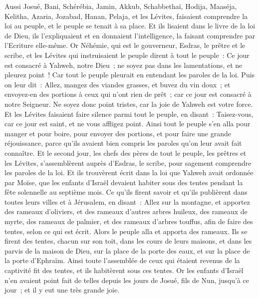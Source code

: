 \begin{multicols}{2}
Aussi Josué, Bani, Schérébia, Jamin, Akkub, Schabbethaï, Hodija, Maaséja, Kelitha, Azaria, Jozabad, Hanan, Pelaja, et les Lévites, faisaient comprendre la loi au peuple, et le peuple se tenait à sa place.
Et ils lisaient dans le livre de la loi de Dieu, ils l'expliquaient et en donnaient l'intelligence, la faisant comprendre par l'Ecriture elle-même.
Or Néhémie, qui est le gouverneur, Esdras, le prêtre et le scribe, et les Lévites qui instruisaient le peuple dirent à tout le peuple~: Ce jour est consacré à Yahweh, notre Dieu~; ne soyez pas dans les lamentations, et ne pleurez point~! Car tout le peuple pleurait en entendant les paroles de la loi.
Puis on leur dit~: Allez, mangez des viandes grasses, et buvez du vin doux~; et envoyez-en des portions à ceux qui n'ont rien de prêt~; car ce jour est consacré à notre Seigneur. Ne soyez donc point tristes, car la joie de Yahweh est votre force.
Et les Lévites faisaient faire silence parmi tout le peuple, en disant~: Taisez-vous, car ce jour est saint, et ne vous affligez point.
Ainsi tout le peuple s'en alla pour manger et pour boire, pour envoyer des portions, et pour faire une grande réjouissance, parce qu'ils avaient bien compris les paroles qu'on leur avait fait connaître.
Et le second jour, les chefs des pères de tout le peuple, les prêtres et les Lévites, s'assemblèrent auprès d'Esdras, le scribe, pour sagement comprendre les paroles de la loi.
Et ils trouvèrent écrit dans la loi que Yahweh avait ordonnée par Moïse, que les enfants d'Israël devaient habiter sous des tentes pendant la fête solennelle au septième mois.
Ce qu'ils firent savoir et qu'ils publièrent dans toutes leurs villes et à Jérusalem, en disant~: Allez sur la montagne, et apportez des rameaux d'oliviers, et des rameaux d'autres arbres huileux, des rameaux de myrte, des rameaux de palmier, et des rameaux d'arbres touffus, afin de faire des tentes, selon ce qui est écrit.
Alors le peuple alla et apporta des rameaux. Ils se firent des tentes, chacun sur son toit, dans les cours de leurs maisons, et dans les parvis de la maison de Dieu, sur la place de la porte des eaux, et sur la place de la porte d'Ephraïm.
Ainsi toute l'assemblée de ceux qui étaient revenus de la captivité fit des tentes, et ils habitèrent sous ces tentes. Or les enfants d'Israël n'en avaient point fait de telles depuis les jours de Josué, fils de Nun, jusqu'à ce jour~; et il y eut une très grande joie.

\end{multicols}
